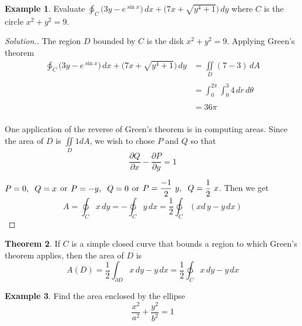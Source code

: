 \documentclass[11pt,a4paper]{article}
\theoremstyle{definition}
\newtheorem{thm}{Theorem}[subsection]
\newtheorem{exa}[thm]{Example}
\newenvironment{solution}
  {\renewcommand{\qedsymbol}{}\begin{proof}[\textit{Solution}.]}
  {\end{proof}}
\begin{document}
\begin{exa}


Evaluate $\displaystyle{\ointctrclockwise_C\Big(3y - e^{\displaystyle{\sin x}}\Big)\,dx + \Big(7x + \sqrt{y^4 + 1}\Big)\,dy}$ where $C$ is the circle $x^2 + y^2 = 9$.
\end{exa}


\begin{solution}


The region $D$ bounded by $C$ is the disk $x^2 + y^2 =9$. Applying Green's theorem 
\begin{align*}
\ointctrclockwise_C \Big( 3y - e^{\displaystyle{\sin x}}\Big)\, dx + \Big( 7x + \sqrt{y^4 + 1}\Big) \,dy
&  = \iint\limits_D (7-3)\,dA\\\\
& = \int^{2\pi}_0 \int^3_0 4\,dr\,d\theta \\\\
& = 36\pi\\
\end{align*}

One application of the reverse of Green's theorem is in computing areas. Since the area of $D$ is $\displaystyle{\iint\limits_D 1 dA}$, we wish to chose $P$ and $Q$ so that $$\frac{\partial Q}{\partial x} - \frac{\partial P}{\partial y} = 1$$

$P = 0,\hspace{0.2cm} Q = x$\hspace{0.2cm} or\hspace{0.2cm} $P = -y,\hspace{0.2cm} Q = 0$\hspace{0.2cm} or\hspace{0.2cm} $P = \dfrac{-1}{2}\,\,y,\hspace{0.2cm} Q = \dfrac{1}{2}\,\,x$. Then we get $$A = \ointctrclockwise_Cx \,dy = - \ointctrclockwise_Cy \,dx=\frac{1}{2} \ointctrclockwise_C(x d\,y-y\,dx)$$
\end{solution}


\begin{thm}


If $C$ is a simple closed curve that bounds a region to which Green's theorem applies, then the area of $D$ is $$ A(D) = \frac{1}{2}\int_{\partial D} x\,dy - y\,dx =\frac{1}{2}\ointctrclockwise_C x\,dy - y\,dx$$
\end{thm}


\begin{exa}


Find the  area enclosed by the ellipse $$\frac{x^2}{a^2} + \frac{y^2}{b^2} = 1$$
\end{exa}
\end{document}
